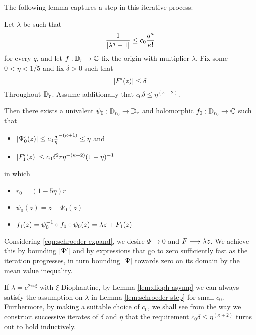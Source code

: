 \documentclass[../main.tex]{subfiles}
\begin{document}
The following lemma captures a step in this iterative process:

\begin{lem}
\label{lem:schroeder-step}
Let $\lambda$ be such that
\[
\frac{1}{\left|\lambda^q - 1\right|} \le c_0 \frac{q^{\kappa}}{\kappa!}
\]
for every $q$, and let $f : \mathbb{D}_{r} \to \mathbb{C}$ fix the origin with multiplier $\lambda$. Fix some $0 < \eta < 1/5$ and fix $\delta > 0$ such that
\[
    \left|F'(z)\right| \le \delta
\]
Throughout $\mathbb{D}_r$. Assume additionally that $c_0 \delta \le \eta^{(\kappa+2)}$.

Then there exists a univalent $\psi_0: \mathbb{D}_{r_0} \to \mathbb{D}_r$ and holomorphic $f_0 : \mathbb{D}_{r_0} \to \mathbb{C}$ such that
\begin{itemize}
    \item $\left|\Psi_0'(z)\right| \le c_0\frac{\delta}\eta^{-(\kappa+1)} \le \eta$ and
    \item $\left|F_1'(z)\right| \le c_0 \delta^2 r \eta^{-(\kappa+2)}(1-\eta)^{-1}$
\end{itemize}
in which
\begin{itemize}
    \item $r_0 = (1-5\eta) r$
    \item $\psi_0(z) = z + \Psi_0(z)$
    \item $f_1(z) = \psi_0^{-1} \circ f_0 \circ \psi_0 (z) = \lambda z + F_1(z)$
\end{itemize}

\end{lem}

\begin{rmk}
Considering \eqref{eqn:schroeder-expand}, we desire $\Psi \to 0$ and $F \longrightarrow \lambda z$. We achieve this by bounding $\left|\Psi'\right|$ and by expressions that go to zero sufficiently fast as the iteration progresses, in turn bounding $\left|\Psi\right|$ towards zero on its domain by the mean value inequality.
\end{rmk}

\begin{rmk}
If $\lambda = e^{2\pi i \xi}$ with $\xi$ Diophantine, by Lemma \ref{lem:dioph-asymp} we can always satisfy the assumption on $\lambda$ in Lemma \ref{lem:schroeder-step} for small $c_0$. Furthermore, by making a suitable choice of $c_0$, we shall see from the way we construct successive iterates of $\delta$ and $\eta$ that the requirement $c_0 \delta \le \eta^{(\kappa+2)}$ turns out to hold inductively.
\end{rmk}
\end{document}

